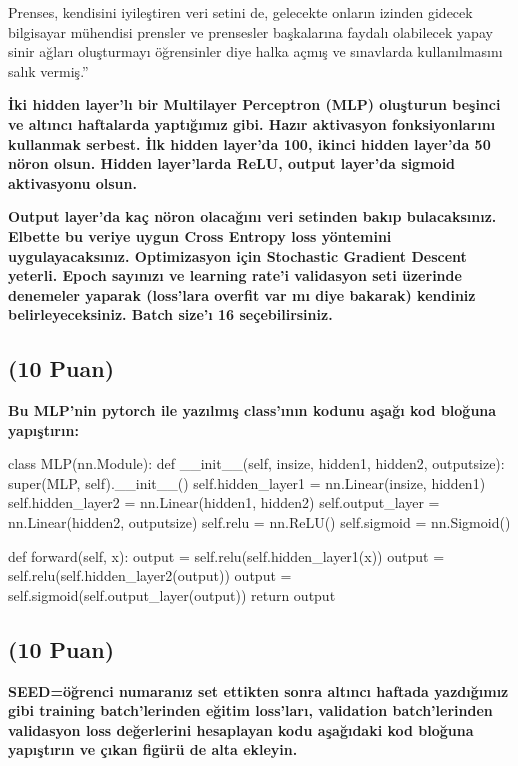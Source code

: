 \documentclass[11pt]{article}
\begin{document}
Prenses, kendisini iyileştiren veri setini de, gelecekte onların izinden gidecek bilgisayar mühendisi prensler ve prensesler başkalarına faydalı olabilecek yapay sinir ağları oluşturmayı öğrensinler diye halka açmış ve sınavlarda kullanılmasını salık vermiş.''

\textbf{İki hidden layer'lı bir Multilayer Perceptron (MLP) oluşturun beşinci ve altıncı haftalarda yaptığımız gibi. Hazır aktivasyon fonksiyonlarını kullanmak serbest. İlk hidden layer'da 100, ikinci hidden layer'da 50 nöron olsun. Hidden layer'larda ReLU, output layer'da sigmoid aktivasyonu olsun.}

\textbf{Output layer'da kaç nöron olacağını veri setinden bakıp bulacaksınız. Elbette bu veriye uygun Cross Entropy loss yöntemini uygulayacaksınız. Optimizasyon için Stochastic Gradient Descent yeterli. Epoch sayınızı ve learning rate'i validasyon seti üzerinde denemeler yaparak (loss'lara overfit var mı diye bakarak) kendiniz belirleyeceksiniz. Batch size'ı 16 seçebilirsiniz.}

\subsection{(10 Puan)} \textbf{Bu MLP'nin pytorch ile yazılmış class'ının kodunu aşağı kod bloğuna yapıştırın:}

\begin{python}
class MLP(nn.Module):
    def __init__(self, insize, hidden1, hidden2, outputsize):
        super(MLP, self).__init__()
        self.hidden_layer1 = nn.Linear(insize, hidden1)
        self.hidden_layer2 = nn.Linear(hidden1, hidden2)
        self.output_layer = nn.Linear(hidden2, outputsize)
        self.relu = nn.ReLU()
        self.sigmoid = nn.Sigmoid()

    def forward(self, x):
        output = self.relu(self.hidden_layer1(x))
        output = self.relu(self.hidden_layer2(output))
        output = self.sigmoid(self.output_layer(output))
        return output
\end{python}

\subsection{(10 Puan)} \textbf{SEED=öğrenci numaranız set ettikten sonra altıncı haftada yazdığımız gibi training batch'lerinden eğitim loss'ları, validation batch'lerinden validasyon loss değerlerini hesaplayan kodu aşağıdaki kod bloğuna yapıştırın ve çıkan figürü de alta ekleyin.}
\end{document}
